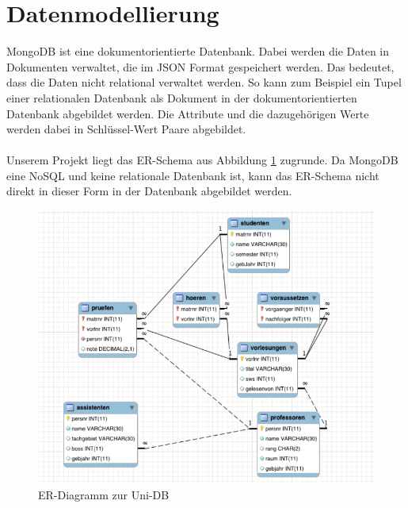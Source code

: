 \section{Datenmodellierung}
\label{kap:ERDiagramm}
MongoDB ist eine dokumentorientierte Datenbank. Dabei werden die Daten in Dokumenten verwaltet, die im JSON Format gespeichert werden. Das bedeutet, dass die Daten nicht relational
verwaltet werden. So kann zum Beispiel ein Tupel einer relationalen Datenbank
als Dokument in der dokumentorientierten Datenbank abgebildet werden. Die
Attribute und die dazugehörigen Werte werden dabei in Schlüssel-Wert Paare
abgebildet. 
\\\\
Unserem Projekt liegt das ER-Schema aus Abbildung \ref{fig:uni-db}
zugrunde.
Da MongoDB eine NoSQL und keine relationale Datenbank ist, kann das ER-Schema nicht direkt
in dieser Form in der Datenbank abgebildet werden. 

\begin{figure}[h] 
	\centering
		\includegraphics[width=1\textwidth]{./pictures/SQL-DB_ER_Diagramm_UNI-DB.png}
	\caption{ER-Diagramm zur Uni-DB \cite{Kaufmann2016}}
	\label{fig:uni-db}
\end{figure}

